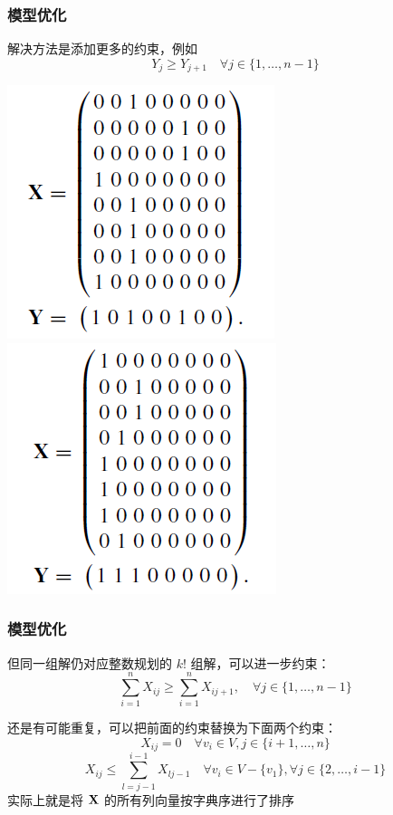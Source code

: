 \documentclass[UTF8]{beamer}
\begin{document}
\begin{frame}
  \frametitle{模型优化}

  解决方法是添加更多的约束，例如
  \[Y_j \geq Y_{j + 1} \quad \forall j \in \{1, \dots, n-1\}\]
  \begin{center}
    \includegraphics[scale=0.5]{figs/sol1.png}
    \includegraphics[scale=0.5]{figs/sol2.png}
  \end{center}
\end{frame}

\begin{frame}
  \frametitle{模型优化}

  但同一组解仍对应整数规划的 $k!$ 组解，可以进一步约束：
  \[\sum_{i = 1}^{n} X_{i j} \geq \sum_{i = 1}^{n} X_{i j + 1}, \quad \forall j \in \{1,\dots,n-1\}\] 

  \pause
  还是有可能重复，可以把前面的约束替换为下面两个约束：
  \[X_{i j} = 0 \quad \forall v_i \in V, j \in \{i + 1, \dots, n\}\]
  \[X_{i j} \leq \sum_{l = j - 1}^{i - 1} X_{lj-1} \quad \forall v_i \in V - \{v_1\}, \forall j \in \{2, \dots, i-1\}\]
  实际上就是将 $\bold{X}$ 的所有列向量按字典序进行了排序

\end{frame}
\end{document}

